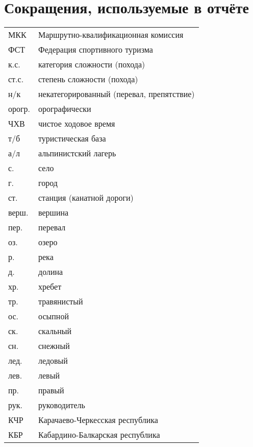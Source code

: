 \section*{Сокращения, используемые в отчёте}
\begin{tabular}{p{} p{}}
	МКК                                  &   Маршрутно-квалификационная комиссия  \\
	ФСТ                                &   Федерация спортивного туризма  \\
	к.с.                               &   категория сложности (похода)  \\
	ст.с.							& степень сложности (похода) \\
	н/к                            &   некатегорированный (перевал, препятствие) \\
	орогр.                &   орографически  \\
	ЧХВ                          &   чистое ходовое время  \\
	т/б                         &   туристическая база \\
	а/л                  &   альпинистский лагерь \\
		с. & село \\
	г. & город \\
	ст. & станция (канатной дороги) \\
	верш.               &   вершина \\
	пер.               &   перевал \\
	оз.             &   озеро \\
	р.             &   река \\
	д.	&	долина\\
	хр. &   хребет \\
	тр. &   травянистый \\
	ос. &   осыпной \\
	ск. &   скальный \\
	сн. &   снежный \\
	лед. &   ледовый \\
	лев. &   левый \\
	пр. &   правый \\
	рук. &   руководитель \\	
	КЧР & Карачаево-Черкесская республика\\
	КБР & Кабардино-Балкарская республика
\end{tabular}
\newpage